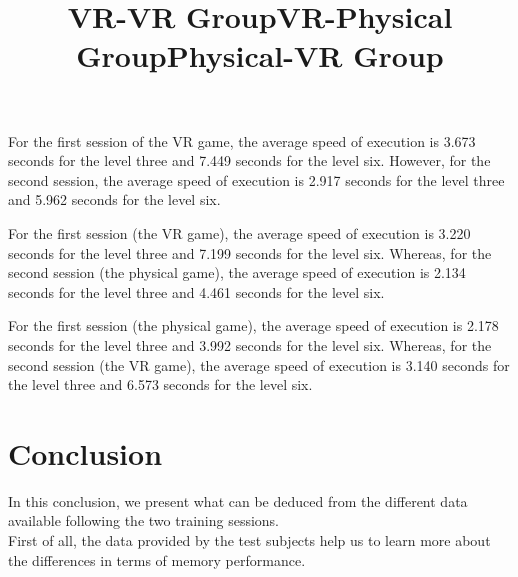 \documentclass[12pt, openany, twocolumn]{article}
\begin{document}
    \noindent \title{\textbf{VR-VR Group}} \vspace{0.25cm}
    
    For the first session of the VR game, the average speed of execution is 3.673 seconds for the level three and 7.449 seconds for the level six. However, for the second session, the average speed of execution is 2.917 seconds for the level three and 5.962 seconds for the level six.
    \\
    
    \noindent \title{\textbf{VR-Physical Group}} \vspace{0.25cm}
    
    For the first session (the VR game), the average speed of execution is 3.220 seconds for the level three and 7.199 seconds for the level six. Whereas, for the second session (the physical game), the average speed of execution is 2.134 seconds for the level three and 4.461 seconds for the level six.
    \\

    \noindent \title{\textbf{Physical-VR Group}} \vspace{0.25cm}
    
    For the first session (the physical game), the average speed of execution is 2.178 seconds for the level three and 3.992 seconds for the level six. Whereas, for the second session (the VR game), the average speed of execution is 3.140 seconds for the level three and 6.573 seconds for the level six.
    \\
 


\section{Conclusion}
    In this conclusion, we present what can be deduced from the different data available following the two training sessions. \\

    First of all, the data provided by the test subjects help us to learn more about the differences in terms of memory performance.
\end{document}
